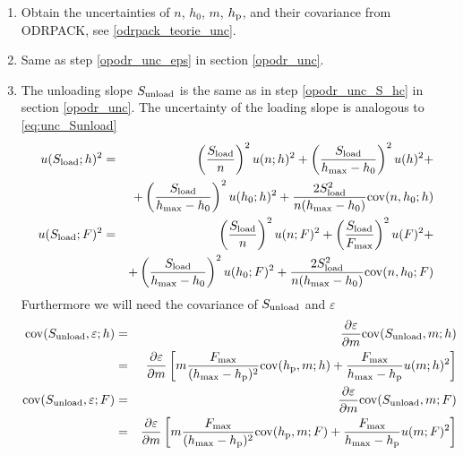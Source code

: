 \begin{enumerate}
 \item \label{slopes_odrpack_unc}
 Obtain the uncertainties of $n$, $h_0$, $m$, $h_\mathrm{p}$, and their covariance from ODRPACK, see \ref{odrpack_teorie_unc}.
 
\item \label{slopes_unc_eps}
  Same as step \ref{opodr_unc_eps} in section \ref{opodr_unc}.

\item \label{slopes_unc_SS}
 The unloading slope $S_{\mathrm{unload}}$ is the same as in step \ref{opodr_unc_S_hc} in section \ref{opodr_unc}. The uncertainty of the loading slope is analogous to \eqref{eq:unc_Sunload}
\begin{eqnarray}
 u(S_{\mathrm{load}};h)^2 &=& 
 \left( \frac{S_{\mathrm{load}}}{n}\right)^2 u(n;h)^2 + 
 \left( \frac{S_{\mathrm{load}}}{h_\mathrm{max}-h_0} \right)^2 u(h)^2 + \nonumber\\ 
  &&+ \left( \frac{S_{\mathrm{load}}}{h_\mathrm{max}- h_0}\right)^2 u(h_0;h)^2 
   + \frac{2S_{\mathrm{load}}^2}{n(h_\mathrm{max} - h_0)} \mathrm{cov}(n,h_0;h)  \nonumber\\
    u(S_{\mathrm{load}};F)^2 &=& 
 \left( \frac{S_{\mathrm{load}}}{n}\right)^2 u(n;F)^2 + 
 \left( \frac{S_{\mathrm{load}}}{F_\mathrm{max}} \right)^2 u(F)^2 + \nonumber \\ 
    &&+ \left( \frac{S_{\mathrm{load}}}{h_\mathrm{max}- h_0}\right)^2 u(h_0;F)^2 
   + \frac{2S_{\mathrm{load}}^2}{n(h_\mathrm{max} - h_0)} \mathrm{cov}(n,h_0;F)  \nonumber \\
\end{eqnarray}
Furthermore we will need the covariance of $S_{\mathrm{unload}}$ and $\varepsilon$
\begin{eqnarray}
 \mathrm{cov}(S_{\mathrm{unload}}, \varepsilon;h ) &=& \frac{\partial \varepsilon}{\partial m} \mathrm{cov}(S_{\mathrm{unload}}, m;h) \nonumber\\
 &=& \frac{\partial \varepsilon}{\partial m} \left[ m\frac{F_\mathrm{max}}{(h_\mathrm{max}-h_\mathrm{p})^2} \mathrm{cov}(h_\mathrm{p},m;h) + \frac{F_\mathrm{max}}{h_\mathrm{max} - h_\mathrm{p}} u(m;h)^2 \right] \nonumber\\
 \mathrm{cov}(S_{\mathrm{unload}}, \varepsilon; F) &=& \frac{\partial \varepsilon}{\partial m} \mathrm{cov}(S_{\mathrm{unload}}, m;F) \nonumber\\
 &=& \frac{\partial \varepsilon}{\partial m} \left[ m\frac{F_\mathrm{max}}{(h_\mathrm{max}-h_\mathrm{p})^2} \mathrm{cov}(h_\mathrm{p},m;F) + \frac{F_\mathrm{max}}{h_\mathrm{max} - h_\mathrm{p}} u(m;F)^2 \right] \nonumber \\
 \end{eqnarray}


\end{enumerate}
